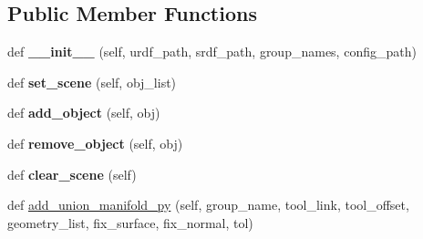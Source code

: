 \subsection*{Public Member Functions}
\begin{DoxyCompactItemize}
\item 
\mbox{\label{classrnb-planning_1_1src_1_1pkg_1_1planning_1_1motion_1_1moveit_1_1moveit__py_1_1_moveit_compact_planner___b_p_ac8f648595b2725f517b6431be1f4af2d}} 
def {\bfseries \+\_\+\+\_\+init\+\_\+\+\_\+} (self, urdf\+\_\+path, srdf\+\_\+path, group\+\_\+names, config\+\_\+path)
\item 
\mbox{\label{classrnb-planning_1_1src_1_1pkg_1_1planning_1_1motion_1_1moveit_1_1moveit__py_1_1_moveit_compact_planner___b_p_afb4eff3508d9d094117d7d5e767821fb}} 
def {\bfseries set\+\_\+scene} (self, obj\+\_\+list)
\item 
\mbox{\label{classrnb-planning_1_1src_1_1pkg_1_1planning_1_1motion_1_1moveit_1_1moveit__py_1_1_moveit_compact_planner___b_p_af6e15e512559cec8b07df89ec34e26a4}} 
def {\bfseries add\+\_\+object} (self, obj)
\item 
\mbox{\label{classrnb-planning_1_1src_1_1pkg_1_1planning_1_1motion_1_1moveit_1_1moveit__py_1_1_moveit_compact_planner___b_p_a4ab9667acdb85f8f3c51dc6243335f1b}} 
def {\bfseries remove\+\_\+object} (self, obj)
\item 
\mbox{\label{classrnb-planning_1_1src_1_1pkg_1_1planning_1_1motion_1_1moveit_1_1moveit__py_1_1_moveit_compact_planner___b_p_ae413fc616d343e69b5d6cd10d545452a}} 
def {\bfseries clear\+\_\+scene} (self)
\item 
def \hyperlink{classrnb-planning_1_1src_1_1pkg_1_1planning_1_1motion_1_1moveit_1_1moveit__py_1_1_moveit_compact_planner___b_p_aa1225a42fa9c38d0bfc4653926e11e0a}{add\+\_\+union\+\_\+manifold\+\_\+py} (self, group\+\_\+name, tool\+\_\+link, tool\+\_\+offset, geometry\+\_\+list, fix\+\_\+surface, fix\+\_\+normal, tol)

\end{DoxyCompactItemize}
